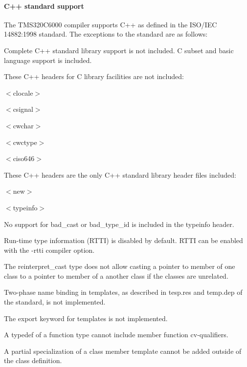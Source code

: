 \hypertarget{a00362_subsubsection__cpp_standard_support_}{}\paragraph{C++ standard support}\label{a00362_subsubsection__cpp_standard_support_}
 The T\+M\+S320\+C6000 compiler supports C++ as defined in the I\+S\+O/\+I\+E\+C 14882\+:1998 standard. The exceptions to the standard are as follows\+: 
\begin{DoxyItemize}
\item Complete C++ standard library support is not included. C subset and basic language support is included.  
\item These C++ headers for C library facilities are not included\+: 
\begin{DoxyItemize}
\item {\ttfamily $<$clocale$>$ } 
\item {\ttfamily $<$csignal$>$}  
\item {\ttfamily $<$cwchar$>$}  
\item {\ttfamily $<$cwctype$>$}  
\item {\ttfamily $<$ciso646$>$}  
\end{DoxyItemize}
\item These C++ headers are the only C++ standard library header files included\+: 
\begin{DoxyItemize}
\item {\ttfamily $<$new$>$}  
\item {\ttfamily $<$typeinfo$>$}  
\end{DoxyItemize}
\item No support for {\ttfamily bad\+\_\+cast} or {\ttfamily bad\+\_\+type\+\_\+id} is included in the typeinfo header.  
\item Run-\/time type information (R\+T\+T\+I) is disabled by default. R\+T\+T\+I can be enabled with the -\/rtti compiler option.  
\item The {\ttfamily reinterpret\+\_\+cast} type does not allow casting a pointer to member of one class to a pointer to member of a another class if the classes are unrelated.  
\item Two-\/phase name binding in templates, as described in tesp.\+res and temp.\+dep of the standard, is not implemented.  
\item The export keyword for templates is not implemented.  
\item A typedef of a function type cannot include member function cv-\/qualifiers.  
\item A partial specialization of a class member template cannot be added outside of the class definition.  
\end{DoxyItemize}

